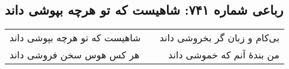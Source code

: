 \begin{center}
\section*{رباعی شماره ۷۴۱: شاهیست که تو هرچه بپوشی داند}
\label{sec:0741}
\begin{longtable}{l p{0.5cm} r}
شاهیست که تو هرچه بپوشی داند
&&
بی‌کام و زبان گر بخروشی داند
\\
هر کس هوس سخن فروشی داند
&&
من بندهٔ آنم که خموشی داند
\\
\end{longtable}
\end{center}
